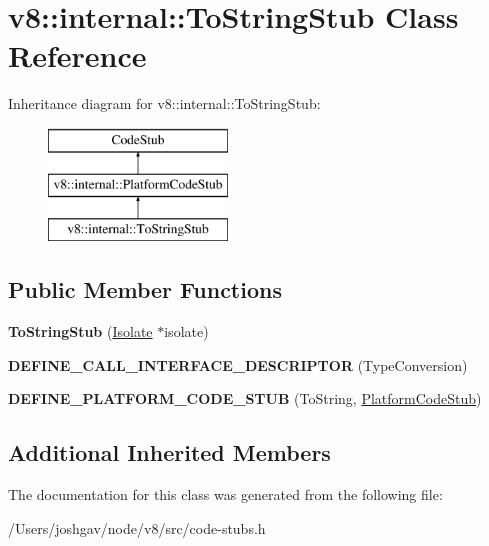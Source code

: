 \hypertarget{classv8_1_1internal_1_1_to_string_stub}{}\section{v8\+:\+:internal\+:\+:To\+String\+Stub Class Reference}
\label{classv8_1_1internal_1_1_to_string_stub}
Inheritance diagram for v8\+:\+:internal\+:\+:To\+String\+Stub\+:\begin{figure}[H]
\begin{center}
\leavevmode
\includegraphics[height=3.000000cm]{classv8_1_1internal_1_1_to_string_stub}
\end{center}
\end{figure}
\subsection*{Public Member Functions}
\begin{DoxyCompactItemize}
\item 
{\bfseries To\+String\+Stub} (\hyperlink{classv8_1_1internal_1_1_isolate}{Isolate} $\ast$isolate)\hypertarget{classv8_1_1internal_1_1_to_string_stub_aeeccb72fbbaeb1ebe3358c15f172c5f9}{}\label{classv8_1_1internal_1_1_to_string_stub_aeeccb72fbbaeb1ebe3358c15f172c5f9}

\item 
{\bfseries D\+E\+F\+I\+N\+E\+\_\+\+C\+A\+L\+L\+\_\+\+I\+N\+T\+E\+R\+F\+A\+C\+E\+\_\+\+D\+E\+S\+C\+R\+I\+P\+T\+OR} (Type\+Conversion)\hypertarget{classv8_1_1internal_1_1_to_string_stub_a5eb85200ce5d5f5f2909faf4e65eb055}{}\label{classv8_1_1internal_1_1_to_string_stub_a5eb85200ce5d5f5f2909faf4e65eb055}

\item 
{\bfseries D\+E\+F\+I\+N\+E\+\_\+\+P\+L\+A\+T\+F\+O\+R\+M\+\_\+\+C\+O\+D\+E\+\_\+\+S\+T\+UB} (To\+String, \hyperlink{classv8_1_1internal_1_1_platform_code_stub}{Platform\+Code\+Stub})\hypertarget{classv8_1_1internal_1_1_to_string_stub_a8293d76169f6944f41904a34de571ea2}{}\label{classv8_1_1internal_1_1_to_string_stub_a8293d76169f6944f41904a34de571ea2}

\end{DoxyCompactItemize}
\subsection*{Additional Inherited Members}


The documentation for this class was generated from the following file\+:\begin{DoxyCompactItemize}
\item 
/\+Users/joshgav/node/v8/src/code-\/stubs.\+h\end{DoxyCompactItemize}
